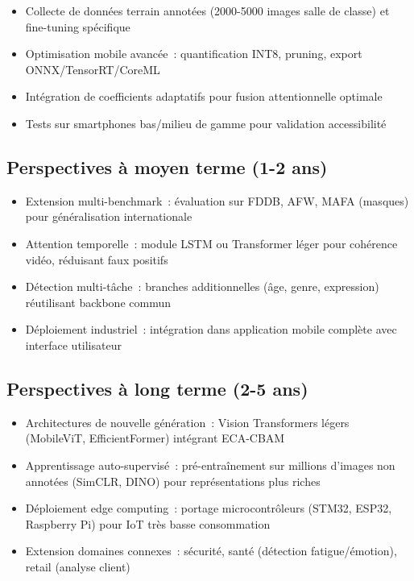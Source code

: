 \begin{onehalfspace}
\begin{itemize}
\item Collecte de données terrain annotées (2000-5000 images salle de classe) et fine-tuning spécifique
\item Optimisation mobile avancée~: quantification INT8, pruning, export ONNX/TensorRT/CoreML
\item Intégration de coefficients adaptatifs pour fusion attentionnelle optimale
\item Tests sur smartphones bas/milieu de gamme pour validation accessibilité
\end{itemize}

\subsection*{Perspectives à moyen terme (1-2 ans)}

\begin{itemize}
\item Extension multi-benchmark~: évaluation sur FDDB, AFW, MAFA (masques) pour généralisation internationale
\item Attention temporelle~: module LSTM ou Transformer léger pour cohérence vidéo, réduisant faux positifs
\item Détection multi-tâche~: branches additionnelles (âge, genre, expression) réutilisant backbone commun
\item Déploiement industriel~: intégration dans application mobile complète avec interface utilisateur
\end{itemize}

\subsection*{Perspectives à long terme (2-5 ans)}

\begin{itemize}
\item Architectures de nouvelle génération~: Vision Transformers légers (MobileViT, EfficientFormer) intégrant ECA-CBAM
\item Apprentissage auto-supervisé~: pré-entraînement sur millions d'images non annotées (SimCLR, DINO) pour représentations plus riches
\item Déploiement edge computing~: portage microcontrôleurs (STM32, ESP32, Raspberry Pi) pour IoT très basse consommation
\item Extension domaines connexes~: sécurité, santé (détection fatigue/émotion), retail (analyse client)
\end{itemize}


\end{onehalfspace}
